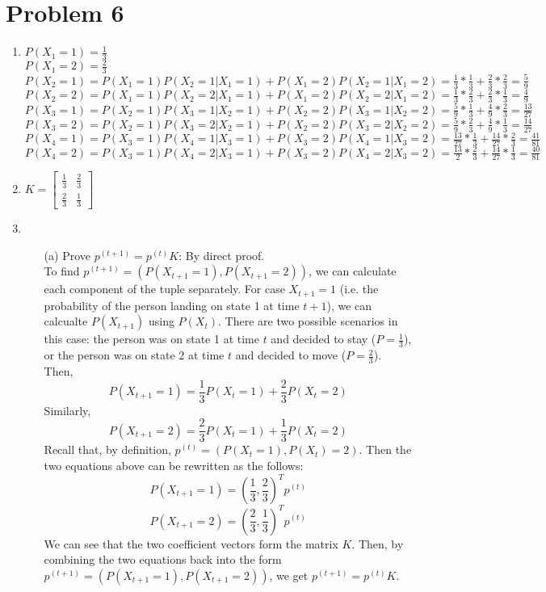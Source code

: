 \documentclass{article}
\begin{document}
\section*{Problem 6}
\begin{enumerate}
    \item
          $P(X_1=1)=\frac{1}{3}$\\
          $P(X_1=2)=\frac{2}{3}$\\
          $P(X_2=1)=P(X_1=1)P(X_2=1|X_1=1)+P(X_1=2)P(X_2=1|X_1=2)=\frac{1}{3}*\frac{1}{3}+\frac{2}{3}*\frac{2}{3}=\frac{5}{9}$\\
          $P(X_2=2)=P(X_1=1)P(X_2=2|X_1=1)+P(X_1=2)P(X_2=2|X_1=2)=\frac{1}{3}*\frac{2}{3}+\frac{2}{3}*\frac{1}{3}=\frac{4}{9}$\\
          $P(X_3=1)=P(X_2=1)P(X_3=1|X_2=1)+P(X_2=2)P(X_3=1|X_2=2)=\frac{5}{9}*\frac{1}{3}+\frac{4}{9}*\frac{2}{3}=\frac{13}{27}$\\
          $P(X_3=2)=P(X_2=1)P(X_3=2|X_2=1)+P(X_2=2)P(X_3=2|X_2=2)=\frac{5}{9}*\frac{2}{3}+\frac{4}{9}*\frac{1}{3}=\frac{14}{27}$\\
          $P(X_4=1)=P(X_3=1)P(X_4=1|X_3=1)+P(X_3=2)P(X_4=1|X_3=2)=\frac{13}{27}*\frac{1}{3}+\frac{14}{27}*\frac{2}{3}=\frac{41}{81}$\\
          $P(X_4=2)=P(X_3=1)P(X_4=2|X_3=1)+P(X_3=2)P(X_4=2|X_3=2)=\frac{13}{2}*\frac{2}{3}+\frac{14}{27}*\frac{1}{3}=\frac{40}{81}$
    \item $K=\begin{bmatrix}
                  \frac{1}{3} & \frac{2}{3} \\
                  \frac{2}{3} & \frac{1}{3}
              \end{bmatrix}$
    \item \begin{itemize}
              \item [(a)] Prove $p^{(t+1)}=p^{(t)}K$: By direct proof.\\
                    To find $p^{(t+1)}=(P(X_{t+1}=1),P(X_{t+1}=2))$, we can calculate each component of the tuple separately. For case $X_{t+1}=1$ (i.e. the probability of the person landing on state 1 at time $t+1$), we can calcualte $P(X_{t+1})$ using $P(X_t)$. There are two possible scenarios in this case: the person was on state 1 at time $t$ and decided to stay ($P=\frac{1}{3}$), or the person was on state 2 at time $t$ and decided to move ($P=\frac{2}{3}$). Then, \[P(X_{t+1}=1)=\frac{1}{3}P(X_t=1)+\frac{2}{3}P(X_t=2)\] Similarly, \[P(X_{t+1}=2)=\frac{2}{3}P(X_t=1)+\frac{1}{3}P(X_t=2)\] Recall that, by definition, $p^{(t)}=(P(X_t=1), P(X_t)=2)$. Then the two equations above can be rewritten as the follows: \[P(X_{t+1}=1)=\left(\frac{1}{3},\frac{2}{3}\right)^Tp^{(t)}\] \[P(X_{t+1}=2)=\left(\frac{2}{3},\frac{1}{3}\right)^Tp^{(t)}\] We can see that the two coefficient vectors form the matrix $K$. Then, by combining the two equations back into the form $p^{(t+1)}=(P(X_{t+1}=1),P(X_{t+1}=2))$, we get $p^{(t+1)}=p^{(t)}K$.


\end{itemize}
\end{enumerate}
\end{document}
